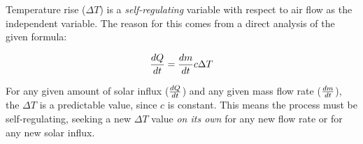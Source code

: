 





Temperature rise ($\Delta T$) is a {\it self-regulating} variable with respect to air flow as the independent variable.  The reason for this comes from a direct analysis of the given formula:

$${dQ \over dt} = {dm \over dt}c \Delta T$$

For any given amount of solar influx ($dQ \over dt$) and any given mass flow rate ($dm \over dt$), the $\Delta T$ is a predictable value, since $c$ is constant.  This means the process must be self-regulating, seeking a new $\Delta T$ value {\it on its own} for any new flow rate or for any new solar influx.












